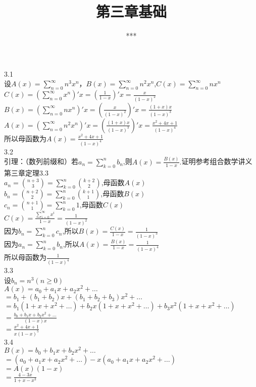 \documentclass{article}
\begin{document}
\title{ 第三章基础}
\author{***}
\date{}
\maketitle

3.1\\
设$A(x)=\sum_{n = 0}^{\infty}n^3x^n$，$B(x)=\sum_{n = 0}^{\infty}n^2x^n$,$C(x)=\sum_{n = 0}^{\infty}nx^n$\\
$C(x)=(\sum_{n = 0}^{\infty}x^n)'x=(\frac{1}{1-x})'x=\frac{x}{(1-x)^2}$\\
$B(x)=(\sum_{n = 0}^{\infty}nx^n)'x=(\frac{x}{(1-x)^2})'x=\frac{(1+x)x}{(1-x)^3}$\\
$A(x)=(\sum_{n = 0}^{\infty}{n^2}x^n)'x=(\frac{(1+x)x}{(1-x)^3})'x=\frac{{x^2}+4x+1}{(1-x)^4}$\\
所以母函数为$A(x)=\frac{{x^2}+4x+1}{(1-x)^4}$\\


3.2\\
引理：（数列前缀和）若$a_n=\sum_{k = 0}^{n}b_n$,则$A(x)=\frac{B(x)}{1-x}.$证明参考组合数学讲义第三章定理3.3\\
$a_n=\binom{n+3}{3}=\sum_{k = 0}^{n}\binom{k+2}{2}$,母函数$A(x)$\\
$b_n=\binom{n+2}{2}=\sum_{k = 0}^{n}\binom{k+1}{1}$,母函数$B(x)$\\
$c_n=\binom{n+1}{1}=\sum_{k = 0}^{n}1$,母函数$C(x)$\\
$C(x)=\frac{\sum_{i = 0}^{\infty}x^i}{1-x}=\frac{1}{(1-x)^2}$\\
因为$b_n=\sum_{k = 0}^{n}c_n$,所以$B(x)=\frac{C(x)}{1-x}=\frac{1}{(1-x)^3}$\\
因为$a_n=\sum_{k = 0}^{n}b_n$,所以$A(x)=\frac{B(x)}{1-x}=\frac{1}{(1-x)^4}$\\
所以母函数为$\frac{1}{(1-x)^4}$\\

3.3\\
设$b_n=n^3(n\geqslant0)$\\
$A(x)=a_0+a_1x+a_2x^2+\ldots$\\
$=b_1+(b_1+b_2)x+(b_1+b_2+b_3)x^2+\ldots$\\
$=b_1(1+x+x^2+\ldots)+b_2x(1+x+x^2+\ldots)+b_3x^2(1+x+x^2+\ldots)$\\
$=\frac{b_0+b_1x+b_2x^2+\ldots}{(1-x)x}$\\
$=\frac{x^2+4x+1}{x(1-x)^5}$\\

3.4\\
$B(x)=b_0+b_1x+b_2x^2+\ldots$\\
$=(a_0+a_1x+a_2x^2+\ldots)-x(a_0+a_1x+a_2x^2+\ldots)$\\
$=A(x)(1-x)$\\
$=\frac{4-3x}{1+x-x^3}$\\
\end{document}
